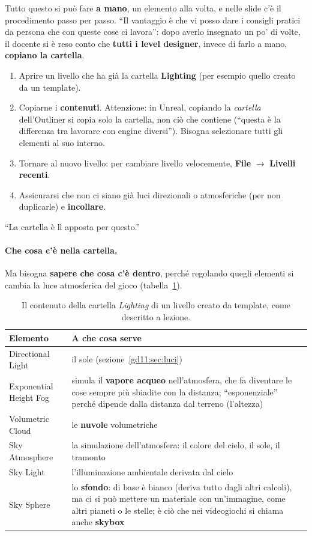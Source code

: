 Tutto questo si può fare \textbf{a mano}, un elemento alla volta, e nelle slide
c'è il procedimento passo per passo. ``Il vantaggio è che vi posso dare i
consigli pratici da persona che con queste cose ci lavora'': dopo averlo
insegnato un po' di volte, il docente si è reso conto che \textbf{tutti i level
designer}, invece di farlo a mano, \textbf{copiano la cartella}.
\begin{enumerate}
  \item Aprire un livello che ha già la cartella \textbf{Lighting} (per esempio
        quello creato da un template).
  \item Copiarne i \textbf{contenuti}. Attenzione: in Unreal, copiando la
        \emph{cartella} dell'Outliner si copia solo la cartella, non ciò che
        contiene (``questa è la differenza tra lavorare con engine diversi'').
        Bisogna selezionare tutti gli elementi al suo interno.
  \item Tornare al nuovo livello: per cambiare livello velocemente,
        \textbf{File} $\rightarrow$ \textbf{Livelli recenti}.
  \item Assicurarsi che non ci siano già luci direzionali o atmosferiche
        (per non duplicarle) e \textbf{incollare}.
\end{enumerate}
``La cartella è lì apposta per questo.''

\paragraph{Che cosa c'è nella cartella.} Ma bisogna \textbf{sapere che cosa c'è
dentro}, perché regolando quegli elementi si cambia la luce atmosferica del
gioco (tabella~\ref{gd11:tab:lighting}).

\begin{table}[htbp]
\centering
\small
\begin{tabular}{@{}p{4.0cm}p{8.6cm}@{}}
\toprule
\textbf{Elemento} & \textbf{A che cosa serve} \\
\midrule
Directional Light & il sole (sezione~\ref{gd11:sec:luci}) \\
Exponential Height Fog & simula il \textbf{vapore acqueo} nell'atmosfera, che fa
  diventare le cose sempre più sbiadite con la distanza; ``esponenziale''
  perché dipende dalla distanza dal terreno (l'altezza) \\
Volumetric Cloud & le \textbf{nuvole} volumetriche \\
Sky Atmosphere & la simulazione dell'atmosfera: il colore del cielo, il sole,
  il tramonto \\
Sky Light & l'illuminazione ambientale derivata dal cielo \\
Sky Sphere & lo \textbf{sfondo}: di base è bianco (deriva tutto dagli altri
  calcoli), ma ci si può mettere un materiale con un'immagine, come altri
  pianeti o le stelle; è ciò che nei videogiochi si chiama anche
  \textbf{skybox} \\
\bottomrule
\end{tabular}
\caption{Il contenuto della cartella \emph{Lighting} di un livello creato da
template, come descritto a lezione.}
\label{gd11:tab:lighting}
\end{table}

